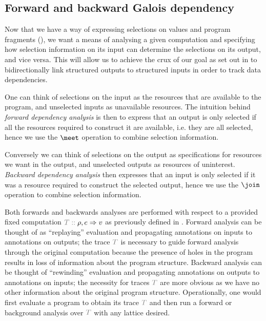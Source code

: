 \subsection{Forward and backward Galois dependency}
\label{sec:core-language:fwd-bwd}

Now that we have a way of expressing selections on values and program fragments (), we want a means of analysing a given computation and specifying how selection information on its input can determine the selections on its output, and vice versa. This will allow us to achieve the crux of our goal as set out in  to bidirectionally link structured outputs to structured inputs in order to track data dependencies.

One can think of selections on the input as the resources that are available to the program, and unselected inputs as unavailable resources. The intuition behind \textit{forward dependency analysis} is then to express that an output is only selected if all the resources required to construct it are available, i.e. they are all selected, hence we use the $\meet$ operation to combine selection information.

Conversely we can think of selections on the output as specifications for resources we want in the output, and unselected outputs as resources of uninterest. \textit{Backward dependency analysis} then expresses that an input is only selected if it was a resource required to construct the selected output, hence we use the $\join$ operation to combine selection information.

Both forwards and backwards analyses are performed with respect to a provided fixed computation $\explVal{T}{\rho, e \evalR v}$ as previously defined in . Forward analysis can be thought of as ``replaying'' evaluation and propagating annotations on inputs to annotations on outputs; the trace $\textcolor{gray}{T}$ is necessary to guide forward analysis through the original computation because the presence of holes in the program results in loss of information about the program structure. Backward analysis can be thought of ``rewinding'' evaluation and propagating annotations on outputs to annotations on inputs; the necessity for traces $\textcolor{gray}{T}$ are more obvious as we have no other information about the original program structure. Operationally, one would first evaluate a program to obtain its trace $\textcolor{gray}{T}$ and then run a forward or background analysis over $\textcolor{gray}{T}$ with any lattice desired.

